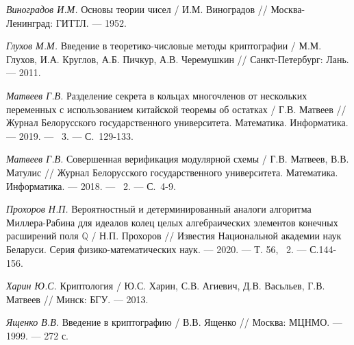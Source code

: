 \begin{thebibliography}{99}
    \textit{Виноградов И.М.} Основы теории чисел / И.М. Виноградов // Москва-Ленинград: ГИТТЛ. --- 1952.

    \textit{Глухов М.М.} Введение в теоретико-числовые методы криптографии / М.М. Глухов, И.А. Круглов, А.Б. Пичкур, А.В. Черемушкин // Санкт-Петербург: Лань. --- 2011.
    
    \textit{Матвеев Г.В.} Разделение секрета в кольцах многочленов от нескольких переменных с использованием китайской теоремы об остатках / Г.В. Матвеев // Журнал Белорусского государственного университета. Математика. Информатика. --- 2019. --- \textnumero~3. --- С.~129-133.
    
    \textit{Матвеев Г.В.} Совершенная верификация модулярной схемы / Г.В. Матвеев, В.В. Матулис // Журнал Белорусского государственного университета. Математика. Информатика. --- 2018. --- \textnumero~2. --- С.~4-9.

    \textit{Прохоров Н.П.} Вероятностный и детерминированный аналоги алгоритма Миллера-Рабина для идеалов колец целых алгебраических элементов конечных расширений поля $\mathbb{Q}$ / Н.П. Прохоров // Известия Национальной академии наук Беларуси. Серия физико-математических наук. --- 2020. --- Т. 56, \textnumero~2. --- С.144-156.
    
    \textit{Харин Ю.С.} Криптология / Ю.С. Харин, С.В. Агиевич, Д.В. Васьльев, Г.В. Матвеев // Минск: БГУ. --- 2013.

    \textit{Ященко В.В.} Введение в криптографию / В.В. Ященко // Москва: МЦНМО. --- 1999. --- 272 с.

\end{thebibliography}




